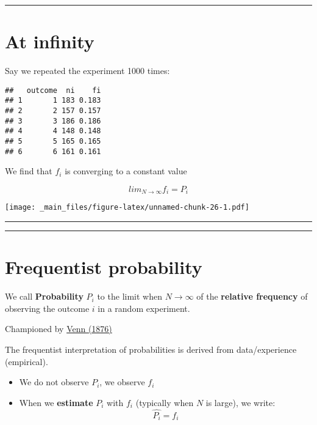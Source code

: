 \documentclass[
]{book}
\providecommand{\tightlist}{%
  \setlength{\itemsep}{0pt}\setlength{\parskip}{0pt}}
\begin{document}
\begin{center}\rule{0.5\linewidth}{0.5pt}\end{center}

\hypertarget{at-infinity}{%
\section{At infinity}\label{at-infinity}}

Say we repeated the experiment 1000 times:

\begin{verbatim}
##   outcome  ni    fi
## 1       1 183 0.183
## 2       2 157 0.157
## 3       3 186 0.186
## 4       4 148 0.148
## 5       5 165 0.165
## 6       6 161 0.161
\end{verbatim}

We find that \(f_i\) is converging to a constant value

\[lim_{N\rightarrow \infty} f_i = P_i\]

\texttt{[image: \_main\_files/figure-latex/unnamed-chunk-26-1.pdf]}

\begin{center}\rule{0.5\linewidth}{0.5pt}\end{center}

\begin{center}\rule{0.5\linewidth}{0.5pt}\end{center}

\hypertarget{frequentist-probability}{%
\section{Frequentist probability}\label{frequentist-probability}}

We call \textbf{Probability} \(P_i\) to the limit when \(N \rightarrow \infty\) of the \textbf{relative frequency} of observing the outcome \(i\) in a random experiment.

Championed by \href{https://plato.stanford.edu/entries/probability-interpret/\#ClaPro}{Venn (1876)}

The frequentist interpretation of probabilities is derived from data/experience (empirical).

\begin{itemize}
\tightlist
\item
  We do not observe \(P_i\), we observe \(f_i\)
\item
  When we \textbf{estimate} \(P_i\) with \(f_i\) (typically when \(N\) is large), we write: \[\hat{P_i}=f_i\]
\end{itemize}
\end{document}
